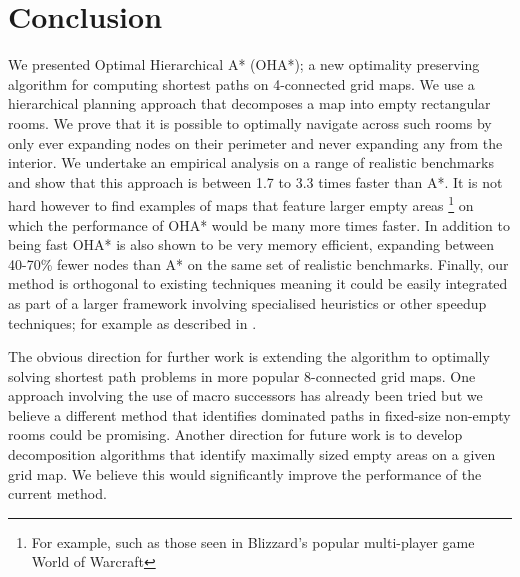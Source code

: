 \section{Conclusion}
We presented Optimal Hierarchical A* (OHA*); a new optimality preserving algorithm for 
computing shortest paths on 4-connected grid maps.
We use a hierarchical planning approach that decomposes a map into empty rectangular rooms.
We prove that it is possible to optimally navigate across such rooms by only ever
expanding nodes on their perimeter and never expanding any from the interior.
We undertake an empirical analysis on a range of realistic benchmarks and show that
this approach is between 1.7 to 3.3 times faster than A*.
It is not hard however to find examples of maps that feature larger empty areas
\footnote{For example, such as those seen in Blizzard's popular multi-player game World of Warcraft} 
on which the performance of OHA* would be many more times faster. 
In addition to being fast OHA* is also shown to be very memory efficient,
expanding between 40-70\% fewer nodes than A* on the same set of realistic benchmarks.
Finally, our method is orthogonal to existing techniques meaning it could be easily integrated
as part of a larger framework involving specialised heuristics or other speedup techniques; 
for example as described in \cite{bjornsson05,bjornsson06}. 
\par
The obvious direction for further work is extending the algorithm to optimally solving 
shortest path problems in more popular 8-connected grid maps. 
One approach involving the use of macro successors has already been tried 
\cite{bolanca09} but we believe a different method that identifies 
dominated paths in fixed-size non-empty rooms could be promising. 
Another direction for future work is to develop decomposition algorithms that identify maximally
sized empty areas on a given grid map.
We believe this would significantly improve the performance of the current method.
